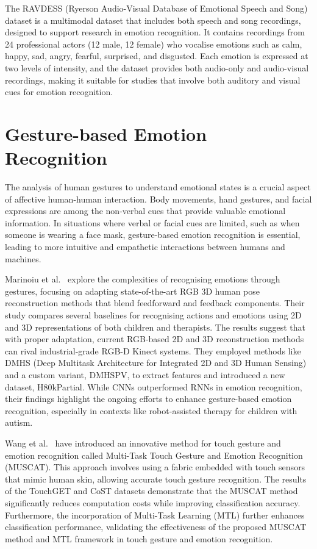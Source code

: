 The RAVDESS (Ryerson Audio-Visual Database of Emotional Speech and Song) dataset \cite{Livingstone2018-li} is a multimodal dataset that includes both speech and song recordings, designed to support research in emotion recognition. It contains recordings from 24 professional actors (12 male, 12 female) who vocalise emotions such as calm, happy, sad, angry, fearful, surprised, and disgusted. Each emotion is expressed at two levels of intensity, and the dataset provides both audio-only and audio-visual recordings, making it suitable for studies that involve both auditory and visual cues for emotion recognition.

\section{Gesture-based Emotion Recognition}

The analysis of human gestures to understand emotional states is a crucial aspect of affective human-human interaction. Body movements, hand gestures, and facial expressions are among the non-verbal cues that provide valuable emotional information. In situations where verbal or facial cues are limited, such as when someone is wearing a face mask, gesture-based emotion recognition is essential, leading to more intuitive and empathetic interactions between humans and machines.

Marinoiu et al.\ \cite{8578328} explore the complexities of recognising emotions through gestures, focusing on adapting state-of-the-art RGB 3D human pose reconstruction methods that blend feedforward and feedback components. Their study compares several baselines for recognising actions and emotions using 2D and 3D representations of both children and therapists. The results suggest that with proper adaptation, current RGB-based 2D and 3D reconstruction methods can rival industrial-grade RGB-D Kinect systems. They employed methods like DMHS (Deep Multitask Architecture for Integrated 2D and 3D Human Sensing) and a custom variant, DMHSPV, to extract features and introduced a new dataset, H80kPartial. While CNNs outperformed RNNs in emotion recognition, their findings highlight the ongoing efforts to enhance gesture-based emotion recognition, especially in contexts like robot-assisted therapy for children with autism.

Wang et al.\ \cite{Wang2022-eq} have introduced an innovative method for touch gesture and emotion recognition called Multi-Task Touch Gesture and Emotion Recognition (MUSCAT). This approach involves using a fabric embedded with touch sensors that mimic human skin, allowing accurate touch gesture recognition. The results of the TouchGET and CoST datasets demonstrate that the MUSCAT method significantly reduces computation costs while improving classification accuracy. Furthermore, the incorporation of Multi-Task Learning (MTL) further enhances classification performance, validating the effectiveness of the proposed MUSCAT method and MTL framework in touch gesture and emotion recognition.

